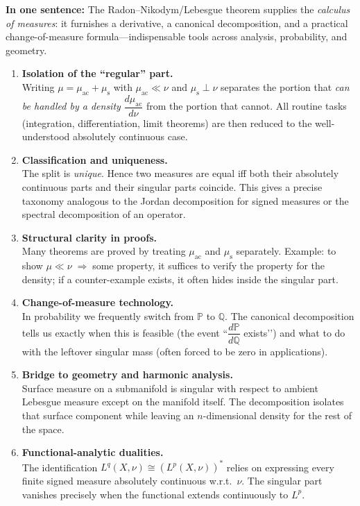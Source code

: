 \documentclass[12pt]{article}
\theoremstyle{definition} %
\theoremstyle{plain} %
\begin{document}
\bigskip
\noindent\textbf{In one sentence:}  
The Radon–Nikodym/Lebesgue theorem supplies the \emph{calculus of measures}: it furnishes a derivative, a canonical decomposition, and a practical change-of-measure formula—indispensable tools across analysis, probability, and geometry.
\begin{enumerate}
  \item \textbf{Isolation of the ``regular'' part.}\\
  Writing $\mu=\mu_{\mathrm{ac}}+\mu_{\mathrm{s}}$ with $\mu_{\mathrm{ac}}\ll\nu$ and $\mu_{\mathrm{s}}\perp\nu$ separates the portion that \emph{can be handled by a density} 
  $\dfrac{d\mu_{\mathrm{ac}}}{d\nu}$ from the portion that cannot.  
  All routine tasks (integration, differentiation, limit theorems) are then reduced to the well-understood absolutely continuous case.

  \item \textbf{Classification and uniqueness.}\\
  The split is \emph{unique}.  
  Hence two measures are equal iff both their absolutely continuous parts and their singular parts coincide.  
  This gives a precise taxonomy analogous to the Jordan decomposition for signed measures or the spectral decomposition of an operator.

  \item \textbf{Structural clarity in proofs.}\\
  Many theorems are proved by treating $\mu_{\mathrm{ac}}$ and $\mu_{\mathrm{s}}$ separately.  
  Example: to show $\mu\!\ll\!\nu\;\Rightarrow\;$some property, it suffices to verify the property for the density;  
  if a counter-example exists, it often hides inside the singular part.

  \item \textbf{Change-of-measure technology.}\\
  In probability we frequently switch from $\mathbb P$ to $\mathbb Q$.  
  The canonical decomposition tells us exactly when this is feasible (the event ``$\dfrac{d\mathbb P}{d\mathbb Q}$ exists’’) and what to do with the leftover singular mass (often forced to be zero in applications).

  \item \textbf{Bridge to geometry and harmonic analysis.}\\
  Surface measure on a submanifold is singular with respect to ambient Lebesgue measure except on the manifold itself.  
  The decomposition isolates that surface component while leaving an $n$-dimensional density for the rest of the space.

  \item \textbf{Functional-analytic dualities.}\\
  The identification $L^{q}(X,\nu)\cong (L^{p}(X,\nu))^{*}$ relies on expressing every finite signed measure absolutely continuous w.r.t.\ $\nu$.  
  The singular part vanishes precisely when the functional extends continuously to $L^{p}$.
\end{enumerate}
\end{document}

